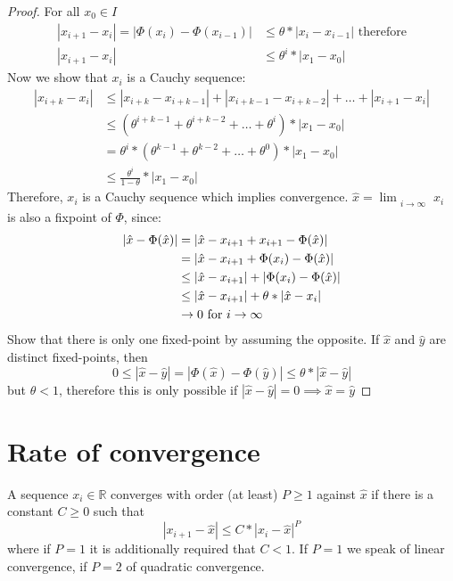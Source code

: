 \begin{proof}
    For all $x_0 \in I$
    \begin{align*}
        |x_{i+1}-x_i|=|\Phi(x_{i})-\Phi(x_{i-1})| &\leq  \theta * |x_i-x_{i-1}| \text{ therefore}\\
        |x_{i+1}-x_i| &\leq \theta^i*|x_1-x_0|
    \end{align*}
    Now we show that $x_i$ is a Cauchy sequence:
    \begin{align*}
        |x_{i+k}-x_i| &\leq |x_{i+k}-x_{i+k-1}|+|x_{i+k-1}-x_{i+k-2}|+\ldots + |x_{i+1}-x_i|\\
        &\leq (\theta^{i+k-1}+\theta^{i+k-2}+\ldots+\theta^i)* |x_1-x_0|\\
        &= \theta^i*(\theta^{k-1}+\theta^{k-2}+\ldots+\theta^{0})*|x_1-x_0| \\
        &\leq \frac{\theta^i}{1-\theta}* |x_1-x_0|
    \end{align*}
    Therefore, $x_i$ is a Cauchy sequence which implies convergence. $\hat{x} = \lim_{\substack{i \to \infty}}x_i$ is also a fixpoint of $\Phi$, since:
    \begin{align*}
        |\hat{x} - \Phi(\hat{x})|&=|\hat{x}-x_{i+1}+x_{i+1}-\Phi(\hat{x})|\\
        & = |\hat{x}-x_{i+1}+\Phi(x_i)-\Phi(\hat{x})|\\
        & \leq |\hat{x}-x_{i+1}| + |\Phi(x_i)-\Phi(\hat{x})|\\
        &  \leq |\hat{x}-x_{i+1}|+ \theta * |\hat{x}-x_i|\\
        &\to 0  \hbox{ for } i \to \infty
    \end{align*}
    Show that there is only one fixed-point by assuming the opposite.
    If $\hat{x}$ and $\hat{y}$ are distinct fixed-points, then
    \begin{equation*}
        0 \leq |\hat{x}-\hat{y}| = |\Phi(\hat{x})-\Phi(\hat{y})| \leq \theta * |\hat{x}-\hat{y}|
    \end{equation*}
    but $\theta < 1$, therefore this is only possible if $|\hat{x}- \hat{y}| = 0 \implies \hat{x} = \hat{y}$
\end{proof}


\section{Rate of convergence}\label{sec:rate-of-convergence}
A sequence $x_i \in \mathbb{R}$ converges with order (at least) $P \geq 1$ against $\hat{x}$ if there is a constant $C \geq 0$ such that
\begin{equation*}
    |x_{i+1}-\hat{x}| \leq C * |x_i-\hat{x}|^P
\end{equation*}
where if $P=1$ it is additionally required that $C<1$.
If $P=1$ we speak of linear convergence, if $P=2$ of quadratic convergence.

